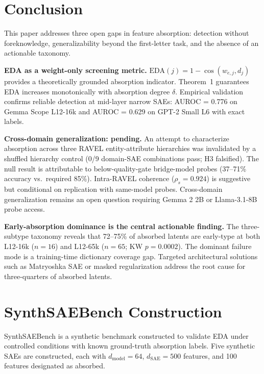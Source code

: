 \documentclass{article}
\begin{document}
\section{Conclusion}

This paper addresses three open gaps in feature absorption: detection without foreknowledge, generalizability beyond the first-letter task, and the absence of an actionable taxonomy.

\textbf{EDA as a weight-only screening metric.} $\text{EDA}(j) = 1 - \cos(w_{e,j}, d_j)$ provides a theoretically grounded absorption indicator. Theorem~1 guarantees EDA increases monotonically with absorption degree $\delta$. Empirical validation confirms reliable detection at mid-layer narrow SAEs: AUROC = 0.776 on Gemma Scope L12-16k and AUROC = 0.629 on GPT-2 Small L6 with exact labels.

\textbf{Cross-domain generalization: pending.} An attempt to characterize absorption across three RAVEL entity-attribute hierarchies was invalidated by a shuffled hierarchy control (0/9 domain-SAE combinations pass; H3 falsified). The null result is attributable to below-quality-gate bridge-model probes (37--71\% accuracy vs.\ required 85\%). Intra-RAVEL coherence ($\rho_s = 0.924$) is suggestive but conditional on replication with same-model probes. Cross-domain generalization remains an open question requiring Gemma 2 2B or Llama-3.1-8B probe access.

\textbf{Early-absorption dominance is the central actionable finding.} The three-subtype taxonomy reveals that 72--75\% of absorbed latents are early-type at both L12-16k ($n = 16$) and L12-65k ($n = 65$; KW $p = 0.0002$). The dominant failure mode is a training-time dictionary coverage gap. Targeted architectural solutions such as Matryoshka SAE or masked regularization address the root cause for three-quarters of absorbed latents.




\appendix

\section{SynthSAEBench Construction}
\label{sec:synthasb}

SynthSAEBench is a synthetic benchmark constructed to validate EDA under controlled conditions with known ground-truth absorption labels. Five synthetic SAEs are constructed, each with $d_{\text{model}} = 64$, $d_{\text{SAE}} = 500$ features, and 100 features designated as absorbed.
\end{document}
